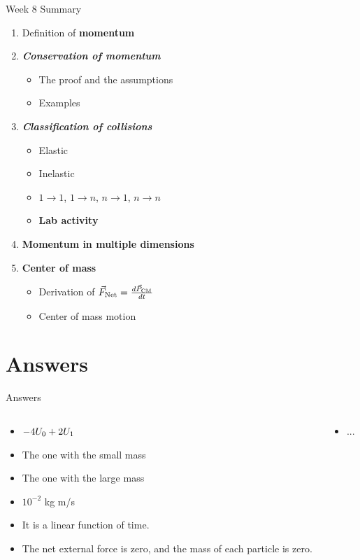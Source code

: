 \documentclass{beamer}
\begin{document}
\begin{frame}{Week 8 Summary}
\begin{enumerate}
\item Definition of \alert{\textbf{momentum}}
\item \alert{\textbf{\textit{Conservation of momentum}}}
\begin{itemize}
\item The proof and the assumptions
\item Examples
\end{itemize}
\item \alert{\textbf{\textit{Classification of collisions}}}
\begin{itemize}
\item Elastic
\item Inelastic
\item $1 \rightarrow 1$, $1 \rightarrow n$, $n \rightarrow 1$, $n \rightarrow n$
\item \textbf{Lab activity}
\end{itemize}
\item \textbf{Momentum in multiple dimensions}
\item \textbf{Center of mass}
\begin{itemize}
\item Derivation of $\vec{F}_{\rm Net} = \frac{d\vec{P}_{\rm CM}}{dt}$
\item Center of mass motion
\end{itemize}
\end{enumerate}
\end{frame}

\section{Answers}

\begin{frame}{Answers}
\begin{columns}[T]
\begin{column}{0.5\textwidth}
\begin{itemize}
\item $-4U_{\rm 0} + 2U_{\rm 1}$
\item The one with the small mass
\item The one with the large mass
\item $10^{-2}$ kg m/s
\item It is a linear function of time.
\item The net external force is zero, and the mass of each particle is zero.
\end{itemize}
\end{column}
\begin{column}{0.5\textwidth}
\begin{itemize}
\item ...
\end{itemize}
\end{column}
\end{columns}
\end{frame}
\end{document}
